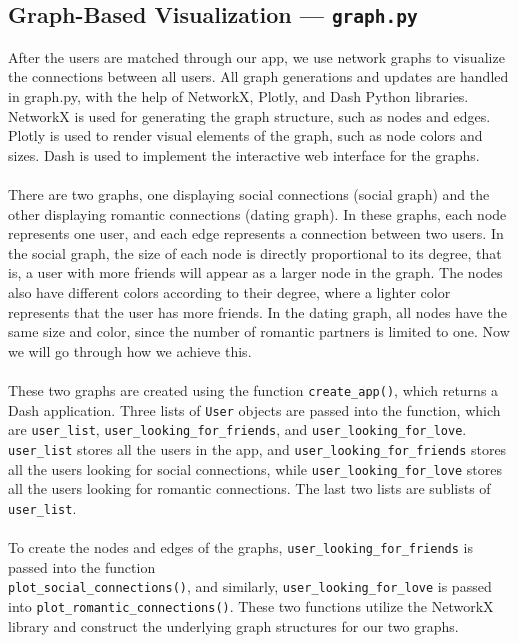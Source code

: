 \documentclass[fontsize=11pt]{article}
\begin{document}
\subsection*{Graph-Based Visualization --- \texttt{graph.py}}
After the users are matched through our app, we use network graphs to visualize the connections between all users. 
All graph generations and updates are handled in graph.py, with the help of NetworkX, Plotly, and Dash Python libraries. 
NetworkX is used for generating the graph structure, such as nodes and edges. 
Plotly is used to render visual elements of the graph, such as node colors and sizes. Dash is used to implement the interactive web interface for the graphs.
\\
\\
There are two graphs, one displaying social connections (social graph) and the other displaying romantic connections (dating graph). 
In these graphs, each node represents one user, and each edge represents a connection between two users. 
In the social graph, the size of each node is directly proportional to its degree, that is, a user with more friends will appear as a larger node in the graph. 
The nodes also have different colors according to their degree, where a lighter color represents that the user has more friends. In the dating graph, all nodes have the same size and color, since the number of romantic partners is limited to one. 
Now we will go through how we achieve this.
\\
\\
These two graphs are created using the function \texttt{create\_app()}, which returns a Dash application.
Three lists of \texttt{User} objects are passed into the function, which are \texttt{user\_list}, \texttt{user\_looking\_for\_friends}, and \texttt{user\_looking\_for\_love}. \texttt{user\_list} stores all the users in the app, and \texttt{user\_looking\_for\_friends} stores all the users looking for social connections, while \texttt{user\_looking\_for\_love} stores all the users looking for romantic connections. 
The last two lists are sublists of \texttt{user\_list}.
\\
\\
To create the nodes and edges of the graphs, \texttt{user\_looking\_for\_friends} is passed into the function
\\
\texttt{plot\_social\_connections()}, and similarly, \texttt{user\_looking\_for\_love} is passed into \texttt{plot\_romantic\_connections()}.
These two functions utilize the NetworkX library and construct the underlying graph structures for our two graphs. 
\end{document}
